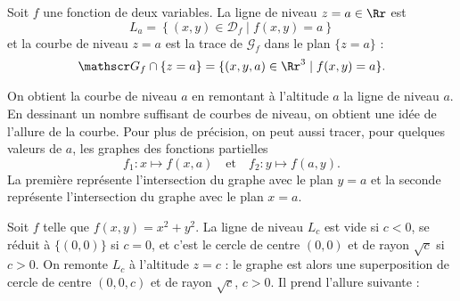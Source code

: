 \documentclass[class=report,crop=false]{standalone}
\begin{document}
\vskip6mm

\begin{definition}Soit $f$ une fonction de deux variables. La ligne de niveau $z=a\in \Rr$ est
$$\displaystyle L_a=\left\{(x,y)\in {\mathscr D}_f\mid f(x,y)=a\right\}$$
et la courbe de niveau $z=a$ est la trace de ${\mathscr G}_f$ dans le plan $\{z=a\}$ : 
$${\mathscr G}_f\cap \{z=a\}=\{(x,y,a)\in \Rr^3\mid f(x,y)=a\}.$$
\end{definition}

\vskip4mm

On obtient la courbe de niveau $a$ en remontant à l'altitude $a$ la ligne de niveau $a$. En dessinant un nombre suffisant de courbes de niveau, on obtient une idée de l'allure de la courbe. Pour plus de précision, on peut aussi tracer, pour quelques valeurs de $a$, les graphes des fonctions partielles
$$f_1:x\mapsto f(x,a)\quad \mbox{et}\quad f_2:y\mapsto f(a,y).$$
La première représente l'intersection du graphe avec le plan $y=a$ et la seconde représente l'intersection du graphe avec le plan $x=a$.

\vskip6mm

Soit $f$ telle que $f(x,y)=x^2+y^2$. La ligne de niveau $L_c$ est vide si $c<0$, se réduit à $\{(0,0)\}$ si $c=0$, et c'est le cercle de centre $(0,0)$ et de rayon $\sqrt{c}$ si $c>0$. On remonte $L_c$ à l'altitude $z=c$ : le graphe est alors une superposition de cercle de centre $(0,0,c)$ et de rayon $\sqrt{c}$, $c>0$. Il prend l'allure suivante :
\end{document}
